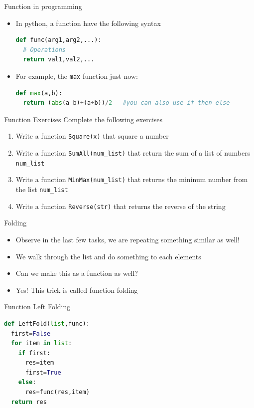 \documentclass[10pt,xcolor={table,dvipsnames},t]{beamer}
\begin{document}
\begin{frame}[fragile]{Function in programming}
  \begin{itemize}
    \item In python, a function have the following syntax
\begin{lstlisting}[language=python]
def func(arg1,arg2,...):
  # Operations
  return val1,val2,...
\end{lstlisting}
  \item For example, the \texttt{max} function just now:
\begin{lstlisting}[language=python]
def max(a,b):
  return (abs(a-b)+(a+b))/2   #you can also use if-then-else
\end{lstlisting}
  \end{itemize}
\end{frame}

\begin{frame}{Function Exercises}
  Complete the following exercises
  \begin{enumerate}
    \item Write a function \texttt{Square(x)} that square a number 
    \item Write a function \texttt{SumAll(num\_list)} that return the sum of a list of numbers \texttt{num\_list}
    \item Write a function \texttt{MinMax(num\_list)} that returns the mininum number from the list \texttt{num\_list}
    \item Write a function \texttt{Reverse(str)} that returns the reverse of the string
  \end{enumerate}
\end{frame}

\begin{frame}{Folding}
  \begin{itemize}
    \item Observe in the last few tasks, we are repeating something similar as well!
    \item We walk through the list and do something to each elements
    \item Can we make this as a function as well?
    \item Yes! This trick is called function folding
  \end{itemize}
\end{frame}

\begin{frame}[fragile]{Function Left Folding}
\begin{lstlisting}[language=python]
def LeftFold(list,func):
  first=False
  for item in list:
    if first:
      res=item
      first=True
    else:
      res=func(res,item)
  return res
\end{lstlisting}
\end{frame}
\end{document}
